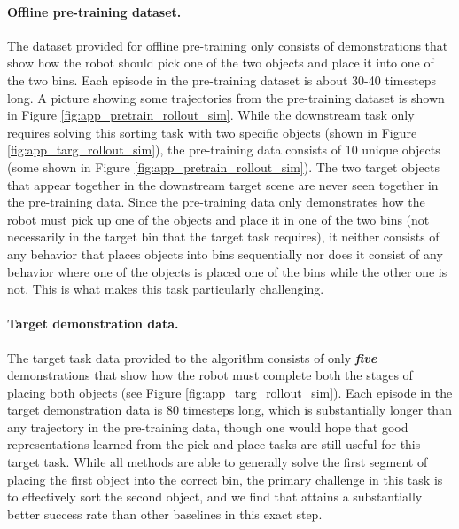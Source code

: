\documentclass[../thesis.tex]{subfiles}
\begin{document}
\paragraph{Offline pre-training dataset.} The dataset provided for offline pre-training only consists of demonstrations that show how the robot should pick one of the two objects and place it into one of the two bins. Each episode in the pre-training dataset is about 30-40 timesteps long. A picture showing some trajectories from the pre-training dataset is shown in Figure \ref{fig:app_pretrain_rollout_sim}. While the downstream task only requires solving this sorting task with two specific objects (shown in Figure \ref{fig:app_targ_rollout_sim}), the pre-training data consists of 10 unique objects (some shown in Figure \ref{fig:app_pretrain_rollout_sim}). The two target objects that appear together in the downstream target scene are never seen together in the pre-training data. Since the pre-training data only demonstrates how the robot must pick up one of the objects and place it in one of the two bins (not necessarily in the target bin that the target task requires), it neither consists of any behavior that places objects into bins sequentially nor does it consist of any behavior where one of the objects is placed one of the bins while the other one is not. This is what makes this  task particularly challenging.

\paragraph{Target demonstration data.} The target task data provided to the algorithm consists of only \textbf{\emph{five}} demonstrations that show how the robot must complete both the stages of placing both objects (see Figure \ref{fig:app_targ_rollout_sim}). Each episode in the target demonstration data is 80 timesteps long, which is substantially longer than any trajectory in the pre-training data, though one would hope that good representations learned from the pick and place tasks are still useful for this target task. While all methods are able to generally solve the first segment of placing the first object into the correct bin, the primary challenge in this task is to effectively sort the second object, and we find that \ptrmethodname attains a substantially better success rate than other baselines in this exact step.  
\end{document}
